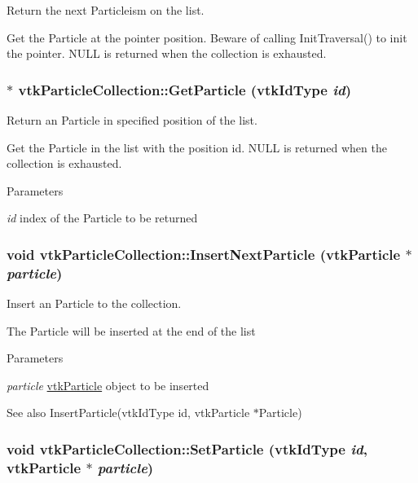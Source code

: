 Return the next Particleism on the list. 

Get the Particle at the pointer position. Beware of calling InitTraversal() to init the pointer. NULL is returned when the collection is exhausted. \hypertarget{classvtkParticleCollection_a5adda32ee7259d736e1b194a00a8aba6}{
\subsubsection[{GetParticle}]{ $\ast$ vtkParticleCollection::GetParticle (vtkIdType {\em id})}}
\label{classvtkParticleCollection_a5adda32ee7259d736e1b194a00a8aba6}


Return an Particle in specified position of the list. 

Get the Particle in the list with the position id. NULL is returned when the collection is exhausted. 
\begin{DoxyParams}{Parameters}
\item[{\em id}]index of the Particle to be returned \end{DoxyParams}
\hypertarget{classvtkParticleCollection_a72a443ca560badd2a938c7f1943bb7bd}{
\subsubsection[{InsertNextParticle}]{\setlength{\rightskip}{0pt plus 5cm}void vtkParticleCollection::InsertNextParticle ({\bf vtkParticle} $\ast$ {\em particle})}}
\label{classvtkParticleCollection_a72a443ca560badd2a938c7f1943bb7bd}


Insert an Particle to the collection. 

The Particle will be inserted at the end of the list 
\begin{DoxyParams}{Parameters}
\item[{\em particle}]\hyperlink{classvtkParticle}{vtkParticle} object to be inserted \end{DoxyParams}
\begin{DoxySeeAlso}{See also}
InsertParticle(vtkIdType id, vtkParticle $\ast$Particle) 
\end{DoxySeeAlso}
\hypertarget{classvtkParticleCollection_ace44cc49f9e3d14367d0c1bea12d13b3}{
\subsubsection[{SetParticle}]{\setlength{\rightskip}{0pt plus 5cm}void vtkParticleCollection::SetParticle (vtkIdType {\em id}, \/  {\bf vtkParticle} $\ast$ {\em particle})}}
\label{classvtkParticleCollection_ace44cc49f9e3d14367d0c1bea12d13b3}


